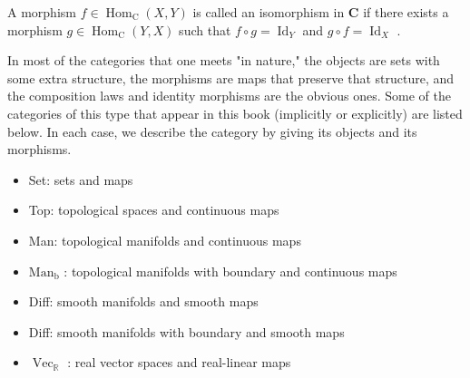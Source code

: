\begin{definition}
\label{def:3-19-extra-2}
\mathlibok
A morphism $f \in  {\operatorname{Hom}}_{\mathrm{C}}\left( {X, Y}\right)$ is called an isomorphism in $\mathbf{C}$ if there exists a morphism $g \in  {\operatorname{Hom}}_{\mathrm{C}}\left( {Y, X}\right)$ such that $f \circ  g = {\operatorname{Id}}_{Y}$ and $g \circ  f = {\operatorname{Id}}_{X}$ .
\end{definition}

\begin{example}[Categories]
\label{ex:3-26}
\leanok
{}
In most of the categories that one meets "in nature," the objects are sets with some extra structure, the morphisms are maps that preserve that structure, and the composition laws and identity morphisms are the obvious ones. Some of the categories of this type that appear in this book (implicitly or explicitly) are listed below. In each case, we describe the category by giving its objects and its morphisms.

\begin{itemize}
\item Set: sets and maps
\end{itemize}

\begin{itemize}
\item Top: topological spaces and continuous maps
\end{itemize}

\begin{itemize}
\item Man: topological manifolds and continuous maps
\end{itemize}

\begin{itemize}
\item ${\mathrm{{Man}}}_{\mathrm{b}}$ : topological manifolds with boundary and continuous maps
\end{itemize}

\begin{itemize}
\item Diff: smooth manifolds and smooth maps
\end{itemize}

\begin{itemize}
\item Diff: smooth manifolds with boundary and smooth maps
\end{itemize}

\begin{itemize}
\item ${\operatorname{Vec}}_{\mathbb{R}}$ : real vector spaces and real-linear maps
\end{itemize}


\end{example}

